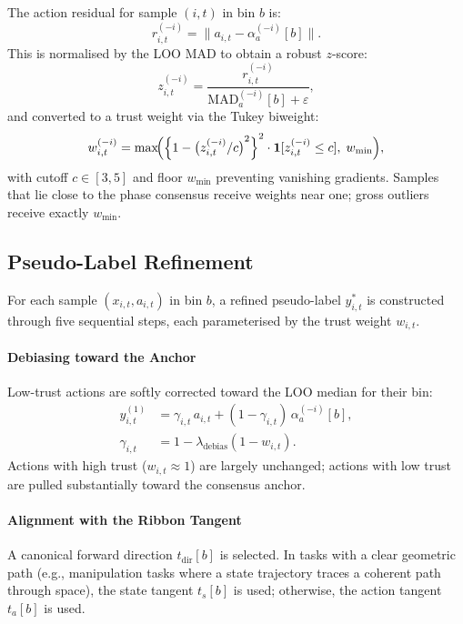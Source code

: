 \documentclass[a4paper, 10pt, conference]{ieeeconf}
\begin{document}
The action residual for sample $(i,t)$ in bin $b$ is:
\begin{equation}
    r_{i,t}^{(-i)} = \|a_{i,t} - \alpha_a^{(-i)}[b]\|.
\end{equation}
This is normalised by the LOO MAD to obtain a robust $z$-score:
\begin{equation}
    z_{i,t}^{(-i)} = \frac{r_{i,t}^{(-i)}}{\mathrm{MAD}_a^{(-i)}[b] + \varepsilon},
\end{equation}
and converted to a trust weight via the Tukey biweight:
\begin{equation}
    w_{i,t}^{(-i)} = \max\!\Bigl({\Bigl\{1-{\bigl(z_{i,t}^{(-i)}/c\bigr)}^2\Bigr\}}^2 \cdot \mathbf{1}[z_{i,t}^{(-i)}\leq c],\; w_{\min}\Bigr),
\end{equation}
with cutoff $c \in [3,5]$ and floor $w_{\min}$ preventing vanishing gradients.
Samples that lie close to the phase consensus receive weights near one; gross outliers receive exactly $w_{\min}$.

\subsection{Pseudo-Label Refinement}

For each sample $(x_{i,t}, a_{i,t})$ in bin $b$, a refined pseudo-label $y^*_{i,t}$ is constructed through five sequential steps, each parameterised by the trust weight $w_{i,t}$.

\paragraph{Debiasing toward the Anchor}
Low-trust actions are softly corrected toward the LOO median for their bin:
\begin{equation}
    \begin{aligned}
        y^{(1)}_{i,t} &= \gamma_{i,t}\, a_{i,t} + (1-\gamma_{i,t})\, \alpha_a^{(-i)}[b],\\
        \gamma_{i,t} &= 1 - \lambda_{\mathrm{debias}}(1-w_{i,t}).
    \end{aligned}
\end{equation}
Actions with high trust ($w_{i,t} \approx 1$) are largely unchanged; actions with low trust are pulled substantially toward the consensus anchor.

\paragraph{Alignment with the Ribbon Tangent}
A canonical forward direction $t_{\mathrm{dir}}[b]$ is selected.
In tasks with a clear geometric path (e.g., manipulation tasks where a state trajectory traces a coherent path through space), the state tangent $t_s[b]$ is used; otherwise, the action tangent $t_a[b]$ is used.
\end{document}

